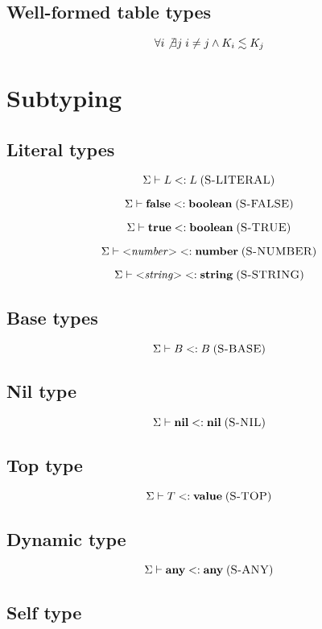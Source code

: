 \documentclass[12pt]{article}
\newcommand{\Top}{\mathbf{value}}
\newcommand{\Any}{\mathbf{any}}
\newcommand{\Nil}{\mathbf{nil}}
\newcommand{\False}{\mathbf{false}}
\newcommand{\True}{\mathbf{true}}
\newcommand{\Boolean}{\mathbf{boolean}}
\newcommand{\Number}{\mathbf{number}}
\newcommand{\String}{\mathbf{string}}
\newcommand{\mylabel}[1]{\; (\textsc{#1})}
\newcommand{\subtype}{<:}
\newcommand{\senv}{\Sigma}
\begin{document}
\subsection{Well-formed table types}

\[
\forall i \not\exists j \; i \not= j \wedge K_{i} \lesssim K_{j}
\]

\section{Subtyping}

\subsection{Literal types}

\[
\senv \vdash L \subtype L
\mylabel{S-LITERAL}
\]

\[
\senv \vdash \False \subtype \Boolean
\mylabel{S-FALSE}
\]

\[
\senv \vdash \True \subtype \Boolean
\mylabel{S-TRUE}
\]

\[
\senv \vdash {<}{\it number}{>} \subtype \Number
\mylabel{S-NUMBER}
\]

\[
\senv \vdash {<}{\it string}{>} \subtype \String
\mylabel{S-STRING}
\]

\subsection{Base types}

\[
\senv \vdash B \subtype B
\mylabel{S-BASE}
\]

\subsection{Nil type}

\[
\senv \vdash \Nil \subtype \Nil
\mylabel{S-NIL}
\]

\subsection{Top type}

\[
\senv \vdash T \subtype \Top
\mylabel{S-TOP}
\]

\subsection{Dynamic type}

\[
\senv \vdash \Any \subtype \Any
\mylabel{S-ANY}
\]

\subsection{Self type}
\end{document}
